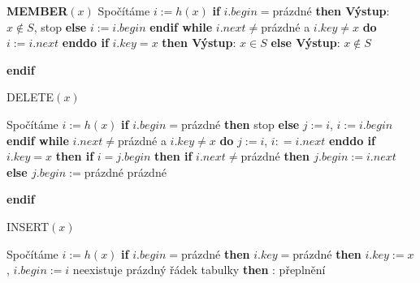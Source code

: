 \documentclass[a4paper,12pt]{article}
\begin{document}
{\bf MEMBER$(x)$}\newline 
Spočítáme $i:=h(x)$\newline 
{\bf if} $i.begin=$prázdné {\bf then Výstup}: $x\notin S$, stop {\bf else} $i:=i.begin$ {\bf endif\newline 
while} $i.next\ne$prázdné a $i.key\ne x$ {\bf do} $i:=i.next$ {\bf enddo \newline 
if} $i.key=x$ {\bf then Výstup}: $x\in S$ {\bf else Výstup}: $
x\notin S$ {\bf endif


DELETE$(x)$}\newline 
Spočítáme $i:=h(x)$\newline 
{\bf if} $i.begin=$prázdné {\bf then} stop {\bf else} $j:=i$, $
i:=i.begin$ {\bf endif\newline 
while} $i.next\ne$prázdné a $i.key\ne x$ {\bf do} $j:=i$, $i:
=i.next$ {\bf enddo \newline 
if} $i.key=x$ {\bf then\newline 
\phantom{{\rm ---}}if} $i=j.begin$ {\bf then\newline 
\phantom{{\rm ------}}if} $i.next\ne$prázdné {\bf then\newline 
\phantom{{\rm ---------}}$j.begin:=i.next$\newline 
\phantom{{\rm ------}}else\newline 
\phantom{{\rm ---------}}$j.begin:=$}prázdné\newline 
{}prázdné\newline 
{\bf endif


INSERT$(x)$}\newline 
Spočítáme $i:=h(x)$\newline 
{\bf if} $i.begin=$prázdné {\bf then}\newline 
\phantom{---}{\bf if} $i.key=$prázdné {\bf then}\newline 
\phantom{------}$i.key:=x$, $i.begin:=i$\newline 
\phantom{---}{\bf else}\newline 
\phantom{------}{\bf if} neexistuje prázdný řádek tabulky {\bf then}\newline 
\phantom{---------}{\bf Výstup}: přeplnění\newline 
\end{document}
